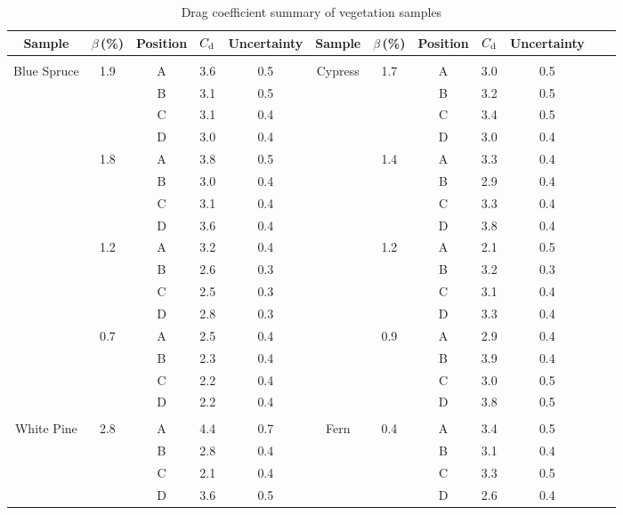\documentclass[12pt]{article}
\begin{document}
\begin{table}[!]

\caption{Drag coefficient summary of vegetation samples}
\label{tab:SumTable}
\centering
	\footnotesize
	\begin{tabular}{cccccccccccc}
			\hline
\textbf{Sample}		& \textbf{$\beta$\,(\%)}		&\textbf{Position}& $C_{\rm d}$ &\textbf{Uncertainty}	&\textbf{Sample}		& \textbf{$\beta$\,(\%)}&\textbf{Position}& 	\textbf{$C_{\rm d}$ }&\textbf{Uncertainty}\\
\hline
\\[0.05cm]
Blue Spruce			&	1.9	&	A	& 	3.6		&	0.5			& Cypress       		&	1.7	&	A	& 	3.0	&	0.5	\\
				&		&	B	& 	3.1		&	0.5			&				&		&	B	& 	3.2	&	0.5	\\
				&		&	C	& 	3.1		&	0.4			&				&		&	C	& 	3.4	&	0.5	\\
				&		&	D	& 	3.0		&	0.4			&				&		&	D	& 	3.0	&	0.4	\\
				&	1.8	&	A	& 	3.8		&	0.5			&				&	1.4	&	A	& 	3.3	&	0.4	\\
				&		&	B	& 	3.0		&	0.4			&				&		&	B	& 	2.9	&	0.4	\\
				&		&	C	& 	3.1		&	0.4			&				&		&	C	& 	3.3	&	0.4	\\
				&		&	D	& 	3.6		&	0.4			&				&		&	D	& 	3.8	&	0.4	\\
				&	1.2	&	A	& 	3.2		&	0.4			&				&	1.2	&	A	& 	2.1	&	0.5	\\
				&		&	B	& 	2.6		&	0.3			&				&		&	B	& 	3.2	&	0.3	\\
				&		&	C	& 	2.5		&	0.3			&				&		&	C	& 	3.1	&	0.4	\\
				&		&	D	& 	2.8		&	0.3			&				&		&	D	& 	3.3	&	0.4	\\
				&	0.7	&	A	& 	2.5		&	0.4			&				&	0.9	&	A	& 	2.9	&	0.4	\\
				&		&	B	& 	2.3		&	0.4			&				&		&	B	& 	3.9	&	0.4	\\
				&		&	C	& 	2.2		&	0.4			&				&		&	C	& 	3.0	&	0.5	\\
				&		&	D	& 	2.2		&	0.4			&				&		&	D	& 	3.8	&	0.5	\\
				&		&		& 			&				&				&		&		& 		&		\\
White Pine	       		&	2.8	&	A	& 	4.4		&	0.7			& Fern	       		&	0.4	&	A	& 	3.4	&	0.5	\\
				&		&	B	& 	2.8		&	0.4			&				&		&	B	& 	3.1	&	0.4	\\
				&		&	C	& 	2.1		&	0.4			&				&		&	C	& 	3.3	&	0.5	\\
				&		&	D	& 	3.6		&	0.5			&				&		&	D	& 	2.6	&	0.4	\\

\end{tabular}
\end{table}
\end{document}
